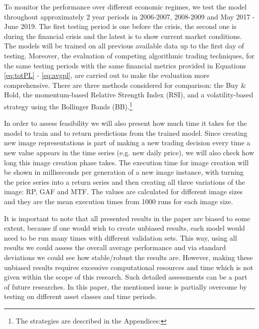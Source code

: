 \documentclass[11pt, a4paper]{article}
\begin{document}
To monitor the performance over different economic regimes, we test the model throughout approximately 2 year periods in 2006-2007, 2008-2009 and May 2017 - June 2019. The first testing period is one before the crisis, the second one is during the financial crisis and the latest is to show current market conditions. 
The models will be trained on all previous available data up to the first day of testing. 
Moreover, the evaluation of competing algorithmic trading techniques, for the same testing periods with the same financial metrics provided in Equations \ref{eq:totPL} - \ref{eq:avgpl}, are carried out to make the evaluation more comprehensive.
There are three methods considered for comparison: the Buy \& Hold, the momentum-based Relative Strength Index (RSI), and a volatility-based strategy using the Bollinger Bands (BB).\footnote{The strategies are described in the Appendices: }

In order to assess feasibility we will also present how much time it takes for the model to train and to return predictions from the trained model. Since creating new image representations is part of making a new trading decision every time a new value appears in the time series (e.g. new daily price), we will also check how long this image creation phase takes.
The execution time for image creation will be shown in milliseconds per generation of a new image instance, with turning the price series into a return series and then creating all three variations of the image: RP, GAF and MTF. The values are calculated for different image sizes and they are the mean execution times from 1000 runs for each image size.

It is important to note that all presented results in the paper are biased to some extent, because if one would wish to create unbiased results, each model would need to be run many times with different validation sets. This way, using all results we could assess the overall average performance and via standard deviations we could see how stable/robust the results are. However, making these unbiased results requires excessive computational resources and time which is not given within the scope of this research. Such detailed assessments can be a part of future researches. In this paper, the mentioned issue is partially overcome by testing on different asset classes and time periods.
\end{document}
